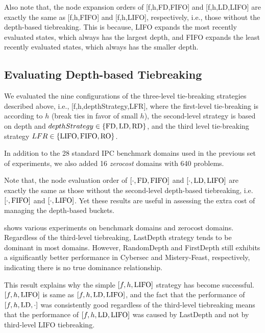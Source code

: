 Also note that, the node expansion orders of [f,h,FD,FIFO] and [f,h,LD,LIFO] are
exactly the same as [f,h,FIFO] and [f,h,LIFO], respectively,
i.e., those without the depth-based
tiebreaking.  
This is because, LIFO expands the most recently evaluated
states, which always has the largest depth, and FIFO expands the least recently
evaluated states, which always has the smaller depth.

 


\subsection{Evaluating Depth-based Tiebreaking}

We evaluated the nine configurations of the three-level tie-breaking strategies described above, i.e., [f,h,depthStrategy,LFR], where the first-level tie-breaking is according to $h$ (break ties in favor of small $h$), the second-level strategy is based on depth and $depthStrategy \in \{\mbox{FD}, \mbox{LD}, \mbox{RD}\}$, and the third level tie-breaking strategy $LFR \in \{\mbox{LIFO}, \mbox{FIFO}, \mbox{RO}\}$.

In addition to the 28 standard IPC benchmark domains used in the previous set of experiments, we also added 16 \emph{zerocost} domains with 640 problems. 

Note that, the node evaluation order of $[\cdot,\mbox{FD},\mbox{FIFO}]$ and $[\cdot,\mbox{LD},\mbox{LIFO}]$
are exactly the same as those without the second-level
depth-based tiebreaking, i.e.\ $[\cdot,\mbox{FIFO}]$ and $[\cdot,\mbox{LIFO}]$.
Yet these results are useful in assessing the extra cost of managing the
depth-based buckets.

 shows various experiments on benchmark domains and
zerocost domains. Regardless of the third-level tiebreaking, LastDepth
strategy tends to be dominant in most domains. However, RandomDepth and
FirstDepth still exhibits a significantly better performance in Cybersec
and Mistery-Feast, respectively, indicating there is no true dominance relationship.

This result explains why the simple $[f,h,\mbox{LIFO}]$ strategy has become
successful. $[f,h,\mbox{LIFO}]$ is same as $[f,h,\mbox{LD},\mbox{LIFO}]$, and the fact
that the performance of $[f,h,\mbox{LD},\cdot]$ was consistently good
regardless of the third-level tiebreaking means that the performance of
$[f,h,\mbox{LD},\mbox{LIFO}]$ was caused by LastDepth and not by third-level LIFO tiebreaking.

